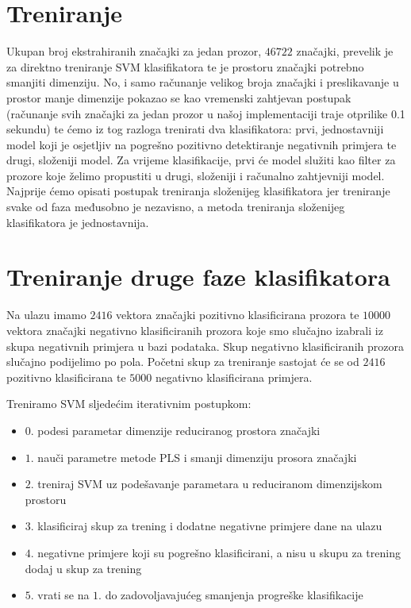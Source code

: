 \documentclass[seminar]{fer}
\begin{document}
\section{Treniranje}
Ukupan broj ekstrahiranih značajki za jedan prozor, $46722$ značajki, prevelik je za direktno treniranje SVM klasifikatora te je prostoru značajki potrebno smanjiti dimenziju. No, i samo računanje velikog broja značajki i preslikavanje u prostor manje dimenzije pokazao se kao vremenski zahtjevan postupak (računanje svih značajki za jedan prozor u našoj implementaciji traje otprilike 0.1 sekundu) te ćemo iz tog razloga trenirati dva klasifikatora: prvi, jednostavniji model koji je osjetljiv na pogrešno pozitivno detektiranje negativnih primjera te drugi, složeniji model.
Za vrijeme klasifikacije, prvi će model služiti kao filter za prozore koje želimo propustiti u drugi, složeniji i računalno zahtjevniji model. Najprije ćemo opisati postupak treniranja složenijeg klasifikatora jer treniranje svake od faza međusobno je nezavisno, a metoda treniranja složenijeg klasifikatora je jednostavnija.


\section{Treniranje druge faze klasifikatora}
Na ulazu imamo $2416$ vektora značajki pozitivno klasificirana prozora te $10000$ vektora značajki negativno klasificiranih prozora koje smo slučajno izabrali iz skupa negativnih primjera u bazi podataka. Skup negativno klasificiranih prozora slučajno podijelimo po pola. Početni skup za treniranje sastojat će se od $2416$ pozitivno klasificirana te $5000$ negativno klasificirana primjera.

Treniramo SVM sljedećim iterativnim postupkom:
\begin{itemize}
\item $0.$ podesi parametar dimenzije reduciranog prostora značajki
\item $1.$ nauči parametre metode PLS i smanji dimenziju prosora značajki
\item $2.$ treniraj SVM uz podešavanje parametara u reduciranom dimenzijskom prostoru
\item $3.$ klasificiraj skup za trening i dodatne negativne primjere dane na ulazu
\item $4.$ negativne primjere koji su pogrešno klasificirani, a nisu u skupu za trening dodaj u skup za trening
\item $5.$ vrati se na $1.$ do zadovoljavajućeg smanjenja progreške klasifikacije
\end{itemize}
\end{document}
